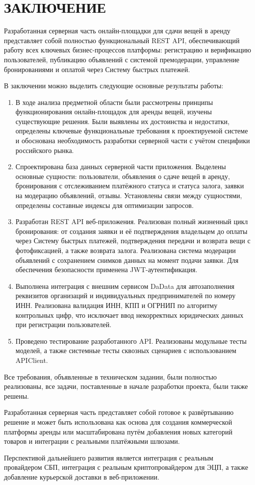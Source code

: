 \section*{ЗАКЛЮЧЕНИЕ}

Разработанная серверная часть онлайн-площадки для сдачи вещей в аренду представляет собой полностью функциональный REST API, обеспечивающий работу всех ключевых бизнес-процессов платформы: регистрацию и верификацию пользователей, публикацию объявлений с системой премодерации, управление бронированиями и оплатой через Систему быстрых платежей.


В заключении можно выделить следующие основные результаты работы:

\begin{enumerate}
\item В ходе анализа предметной области были рассмотрены принципы функционирования онлайн-площадок для аренды вещей, изучены существующие решения. Были выявлены их достоинства и недостатки, определены ключевые функциональные требования к проектируемой системе и обоснована необходимость разработки серверной части с учётом специфики российского рынка.
\item Спроектирована база данных серверной части приложения. Выделены основные сущности: пользователи, объявления о сдаче вещей в аренду, бронирования с отслеживанием платёжного статуса и статуса залога, заявки на модерацию объявлений, отзывы. Установлены связи между сущностями, определены составные индексы для оптимизации запросов.
\item Разработан REST API веб-приложения. Реализован полный жизненный цикл бронирования: от создания заявки и её подтверждения владельцем до оплаты через Систему быстрых платежей, подтверждения передачи и возврата вещи с фотофиксацией, а также возврата залога. Реализована система модерации объявлений с сохранением снимков данных на момент подачи заявки. Для обеспечения безопасности применена JWT-аутентификация.
\item Выполнена интеграция с внешним сервисом DaData для автозаполнения реквизитов организаций и индивидуальных предпринимателей по номеру ИНН. Реализована валидация ИНН, КПП и ОГРНИП по алгоритму контрольных цифр, что исключает ввод некорректных юридических данных при регистрации пользователей.
\item Проведено тестирование разработанного API. Реализованы модульные тесты моделей, а также системные тесты сквозных сценариев с использованием APIClient.
\end{enumerate}

Все требования, объявленные в техническом задании, были полностью реализованы, все задачи, поставленные в начале разработки проекта, были также решены.

Разработанная серверная часть представляет собой готовое к развёртыванию решение и может быть использована как основа для создания коммерческой платформы аренды или масштабирована путём добавления новых категорий товаров и интеграции с реальными платёжными шлюзами.

Перспективой дальнейшего развития является интеграция с реальным провайдером СБП, интеграция с реальным криптопровайдером для ЭЦП, а также добавление курьерской доставки в веб-приложении. 
